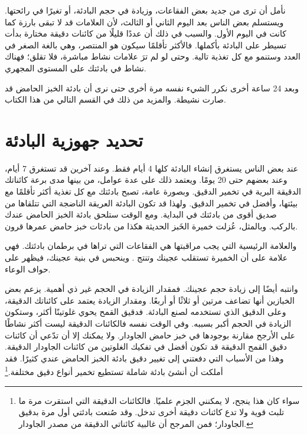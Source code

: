 نأمل أن ترى من جديد بعض الفقاعات، وزيادة في حجم البادئة، أو تغيرًا في رائحتها. ويستسلم بعض الناس بعد اليوم الثاني أو الثالث، لأن العلامات قد لا تبقى بارزة كما كانت في اليوم الأول. والسبب في ذلك أن عددًا قليلًا من كائنات دقيقة مختارة بدأت تسيطر على البادئة بأكملها. فالأكثر تأقلمًا سيكون هو المنتصر، وهي بالغة الصغر في العدد وستنمو مع كل تغذية تالية. وحتى لو لم ترَ علامات نشاط مباشرة، فلا تقلق؛ فهناك نشاط في بادئتك على المستوى المجهري.

وبعد 24 ساعة أخرى نكرر الشيء نفسه مرة أخرى حتى نرى أن بادئة الخبز الحامض قد صارت نشيطة. والمزيد من ذلك في القسم التالي من هذا الكتاب.
\section{تحديد جهوزية البادئة}

عند بعض الناس يستغرق إنشاء البادئة كلها 4 أيام فقط. وعند آخرين قد تستغرق 7 أيام، وعند بعضهم حتى 20 يومًا. ويعتمد ذلك على عدة عوامل، من بينها مدى برعة كائناتك الدقيقة البرية في تخمير الدقيق. وبصورة عامة، تصبح بادئتك مع كل تغذية أكثر تأقلمًا مع بيئتها، وأفضل في تخمير الدقيق. ولهذا قد تكون البادئة العريقة الناضجة التي تتلقاها من صديق أقوى من بادئتك في البداية. ومع الوقت ستلحق بادئة الخبز الحامض عندك بالركب. وبالمثل، عُزلت خميرة الخَبز الحديثة هكذا من بادئات خبز حامض عمرها قرون.

\begin{flowchart}[!htb]
\centering
  
  \caption[تحديد جهوزية بادئة الخبز الحامض]{مخطط تدفق يريك كيف تحدد جهوزية بادئة الخبز الحامض للاستخدام. احرص على الانتظار  على الأقل بعد تغذية بادئتك قبل التحقق من جهوزيتها. ولتقييمها، انظر إلى زيادة حجم بادئتك وملمسها الإسفنجي، وسجّل رائحتها. فالعوامل الثلاثة كلها مهمة لتقييم مستوى نشاط بادئتك تقييمًا سليمًا. والبادئة النشيطة أساس مهم لتخمير عجين ناجح.}%
  \label{fig:sourdough-starter-readiness}
\end{flowchart}

والعلامة الرئيسية التي يجب مراقبتها هي الفقاعات التي تراها في برطمان بادئتك. فهي علامة على أن الخميرة تستقلب عجينك وتنتج . وينحبس  في بنية عجينك، فيظهر على حواف الوعاء.

وانتبه أيضًا إلى زيادة حجم عجينك. فمقدار الزيادة في الحجم غير ذي أهمية. يزعم بعض الخبازين أنها تضاعف مرتين أو ثلاثًا أو أربعًا. ومقدار الزيادة يعتمد على كائناتك الدقيقة، وعلى الدقيق الذي تستخدمه لصنع البادئة. فدقيق القمح يحوي غلوتينًا أكثر، وستكون الزيادة في الحجم أكبر بسببه. وفي الوقت نفسه فالكائنات الدقيقة ليست أكثر نشاطًا على الأرجح مقارنة بوجودها في خبز حامض الجاودار. ولا يمكنك إلا أن تدّعي أن كائنات دقيق القمح الدقيقة قد تكون أفضل في تفكيك الغلوتين من كائنات الجاودار الدقيقة. وهذا من الأسباب التي دفعتني إلى تغيير دقيق بادئة الخبز الحامض عندي كثيرًا. فقد أملكت أن أنشئ بادئة شاملة تستطيع تخمير أنواع دقيق مختلفة.\footnote{سواء كان هذا ينجح، لا يمكنني الجزم علميًا. فالكائنات الدقيقة التي استقرت مرة ما تلبث قوية ولا تدع كائنات دقيقة أخرى تدخل. وقد صُنعت بادئتي أول مرة بدقيق الجاودار؛ فمن المرجح أن غالبية كائناتي الدقيقة من مصدر الجاودار.}

